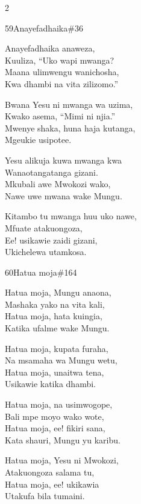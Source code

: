 \begin{multicols}{2}
\begin{hymn}{59}{Anayefadhaika}{\#36}
\begin{stanza}
Anayefadhaika anaweza,\\
Kuuliza, ``Uko wapi mwanga?\\
Maana ulimwengu wanichosha,\\
Kwa dhambi na vita zilizomo.''
\end{stanza}
\begin{stanza}
Bwana Yesu ni mwanga wa uzima,\\
Kwako asema, ``Mimi ni njia.''\\
Mwenye shaka, huna haja kutanga,\\
Mgeukie usipotee.
\end{stanza}
\begin{stanza}
Yesu alikuja kuwa mwanga kwa\\
Wanaotangatanga gizani.\\
Mkubali awe Mwokozi wako,\\
Nawe uwe mwana wake Mungu.
\end{stanza}
\begin{stanza}
Kitambo tu mwanga huu uko nawe,\\
Mfuate atakuongoza,\\
Ee! usikawie zaidi gizani,\\
Ukichelewa utamkosa.
\end{stanza}
\end{hymn}

\begin{hymn}{60}{Hatua moja}{\#164}
\begin{stanza}
Hatua moja, Mungu anaona,\\
Mashaka yako na vita kali,\\
Hatua moja, hata kuingia,\\
Katika ufalme wake Mungu.
\end{stanza}
\begin{stanza}
Hatua moja, kupata furaha,\\
Na msamaha wa Mungu wetu,\\
Hatua moja, unaitwa tena,\\
Usikawie katika dhambi.
\end{stanza}
\begin{stanza}
Hatua moja, na usimwogope,\\
Bali mpe moyo wako wote,\\
Hatua moja, ee! fikiri sana,\\
Kata shauri, Mungu yu karibu.
\end{stanza}
\begin{stanza}
Hatua moja, Yesu ni Mwokozi,\\
Atakuongoza salama tu,\\
Hatua moja, ee! ukikawia\\
Utakufa bila tumaini.
\end{stanza}
\end{hymn}


\end{multicols}

